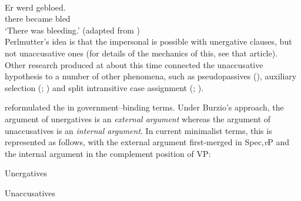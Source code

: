 \documentclass[output=paper]{langsci/langscibook}
\begin{document}
\ea {}\\
    \gll  *  Er   werd   gebloed.\\
          {}  there   became   bled\\
    \glt  {}  \enquote*{There was bleeding.} (adapted from \citealt[131]{Zaenen1993})\\
\z
Perlmutter’s idea is that the impersonal  is possible with unergative
claus\-es, but not unaccusative ones (for details of the mechanics of this, see
that article).  Other research produced at about this time connected the
unaccusative hypothesis to a number of other phenomena, such as pseudopassives
(\citealt[§6.3]{PerlmutterPostal1984}), auxiliary selection
(\citealt{Burzio1981,Burzio1986}; \citealt{Perlmutter1989}) and split
intransitive case assignment (\citealt[165--166]{Perlmutter1978};
\citealt{Harris1981}).

\textcite{Burzio1981,Burzio1986} reformulated the  in
government--binding terms. Under Burzio’s approach, the argument of unergatives
is an \emph{external argument} whereas the argument of unaccusatives is an
\emph{internal argument}. In current minimalist terms, this is represented as
follows, with the external argument first-merged in Spec,\emph{v}P and the
internal argument in the complement position of VP:

\begin{multicols}{2}
\ea
    \ea Unergatives\\
    \ex Unaccusatives\\
    \z
\z
\end{multicols}
\end{document}
